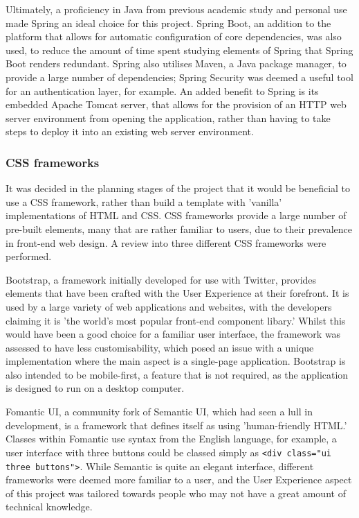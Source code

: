 Ultimately, a proficiency in Java from previous academic study and personal use made Spring an ideal choice for this project. Spring Boot, an addition to the platform that allows for automatic configuration of core dependencies, was also used, to reduce the amount of time spent studying elements of Spring that Spring Boot renders redundant. Spring also utilises Maven, a Java package manager, to provide a large number of dependencies; Spring Security was deemed a useful tool for an authentication layer, for example. An added benefit to Spring is its embedded Apache Tomcat server, that allows for the provision of an HTTP web server environment from opening the application, rather than having to take steps to deploy it into an existing web server environment.

\subsubsection{CSS frameworks}

It was decided in the planning stages of the project that it would be beneficial to use a CSS framework, rather than build a template with 'vanilla' implementations of HTML and CSS. CSS frameworks provide a large number of pre-built elements, many that are rather familiar to users, due to their prevalence in front-end web design. A review into three different CSS frameworks were performed.

Bootstrap, a framework initially developed for use with Twitter, provides elements that have been crafted with the User Experience at their forefront. It is used by a large variety of web applications and websites, with the developers claiming it is 'the world's most popular front-end component libary.' Whilst this would have been a good choice for a familiar user interface, the framework was assessed to have less customisability, which posed an issue with a unique implementation where the main aspect is a single-page application. Bootstrap is also intended to be mobile-first, a feature that is not required, as the application is designed to run on a desktop computer.

Fomantic UI, a community fork of Semantic UI, which had seen a lull in development, is a framework that defines itself as using 'human-friendly HTML.' Classes within Fomantic use syntax from the English language, for example, a user interface with three buttons could be classed simply as \texttt{<div class="ui three buttons">}. While Semantic is quite an elegant interface, different frameworks were deemed more familiar to a user, and the User Experience aspect of this project was tailored towards people who may not have a great amount of technical knowledge.

